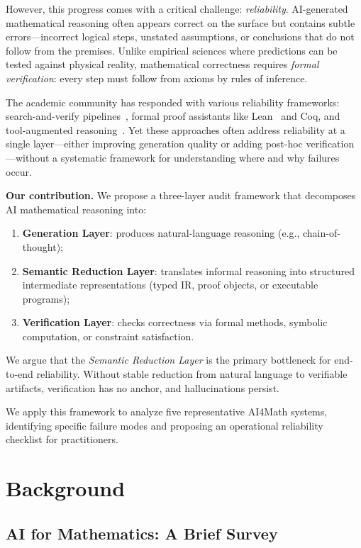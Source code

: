 \documentclass[11pt,a4paper]{article}
\begin{document}
However, this progress comes with a critical challenge: \emph{reliability}. AI-generated mathematical reasoning often appears correct on the surface but contains subtle errors---incorrect logical steps, unstated assumptions, or conclusions that do not follow from the premises. Unlike empirical sciences where predictions can be tested against physical reality, mathematical correctness requires \emph{formal verification}: every step must follow from axioms by rules of inference.

The academic community has responded with various reliability frameworks: search-and-verify pipelines~\cite{cobbe2021training}, formal proof assistants like Lean~\cite{avigad2014lean} and Coq, and tool-augmented reasoning~\cite{schick2023toolformer,gao2023pal}. Yet these approaches often address reliability at a single layer---either improving generation quality or adding post-hoc verification---without a systematic framework for understanding where and why failures occur.

\textbf{Our contribution.} We propose a three-layer audit framework that decomposes AI mathematical reasoning into:
\begin{enumerate}
  \item \textbf{Generation Layer}: produces natural-language reasoning (e.g., chain-of-thought);
  \item \textbf{Semantic Reduction Layer}: translates informal reasoning into structured intermediate representations (typed IR, proof objects, or executable programs);
  \item \textbf{Verification Layer}: checks correctness via formal methods, symbolic computation, or constraint satisfaction.
\end{enumerate}

We argue that the \emph{Semantic Reduction Layer} is the primary bottleneck for end-to-end reliability. Without stable reduction from natural language to verifiable artifacts, verification has no anchor, and hallucinations persist.

We apply this framework to analyze five representative AI4Math systems, identifying specific failure modes and proposing an operational reliability checklist for practitioners.

\section{Background}
\label{sec:background}

\subsection{AI for Mathematics: A Brief Survey}
\end{document}
